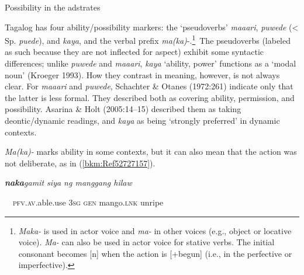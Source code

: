 \setcounter{listWWNumiiileveli}{0}
\begin{listWWNumiiileveli}
\item 

\setcounter{listWWNumiiilevelii}{0}
\begin{listWWNumiiilevelii}
\item 
\begin{stylelsSectionii}
Possibility in the adstrates
\end{stylelsSectionii}
\end{listWWNumiiilevelii}
\end{listWWNumiiileveli}
\begin{styleStandard}
Tagalog has four ability/possibility markers: the ‘pseudoverbs’ \textit{maaari}, \textit{puwede} ({\textless} Sp. \textit{puede}), and \textit{kaya}, and the verbal prefix \textit{ma(ka)}{}-.\textstyleFootnoteSymbol{ }\footnote{\textit{Maka-} is used in actor voice and \textit{ma- }in other voices (e.g., object or locative voice). \textit{Ma- }can also be used in actor voice for stative verbs. The initial consonant becomes [n] when the action is [+begun] (i.e., in the perfective or imperfective).}\ The pseudoverbs (labeled as such because they are not inflected for aspect) exhibit some syntactic differences; unlike \textit{puwede} and \textit{maaari}, \textit{kaya} ‘ability, power’ functions as a ‘modal noun’ (Kroeger 1993). How they contrast in meaning, however, is not always clear. For \textit{maaari} and \textit{puwede}, Schachter \& Otanes (1972:261) indicate only that the latter is less formal. They described both as covering ability, permission, and possibility. Asarina \& Holt (2005:14–15) described them as taking deontic/dynamic readings, and \textit{kaya} as being ‘strongly preferred’ in dynamic contexts. 
\end{styleStandard}

\begin{styleStandard}
\textit{Ma(ka)-} marks ability in some contexts, but it can also mean that the action was not deliberate, as in (\ref{bkm:Ref52727157}).
\end{styleStandard}


\setcounter{listWWNumiileveli}{0}
\begin{listWWNumiileveli}
\item 
\begin{stylelsLanginfo}
\label{bkm:Ref52727157}\textbf{\textit{naka}}\textit{gamit siya ng manggang hilaw}
\end{stylelsLanginfo}
\end{listWWNumiileveli}
\begin{stylelsIMT}
\ \ \textsc{pfv.av}.able.use 3\textsc{sg} \textsc{gen} mango.\textsc{lnk} unripe 
\end{stylelsIMT}

